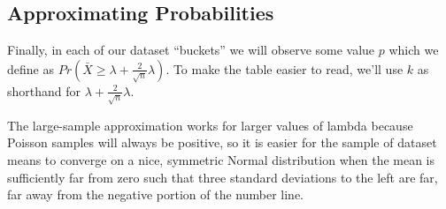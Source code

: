 \documentclass[
]{article}
\begin{document}
\hypertarget{approximating-probabilities}{%
\subsection{Approximating
Probabilities}\label{approximating-probabilities}}

Finally, in each of our dataset ``buckets'' we will observe some value
\(p\) which we define as
\(Pr\left(\bar{X} \geq \lambda + \frac{2}{\sqrt{n}} \lambda \right)\).
To make the table easier to read, we'll use \(k\) as shorthand for
\(\lambda + \frac{2}{\sqrt{n}} \lambda\).

The large-sample approximation works for larger values of lambda because
Poisson samples will always be positive, so it is easier for the sample
of dataset means to converge on a nice, symmetric Normal distribution
when the mean is sufficiently far from zero such that three standard
deviations to the left are far, far away from the negative portion of
the number line.
\end{document}
